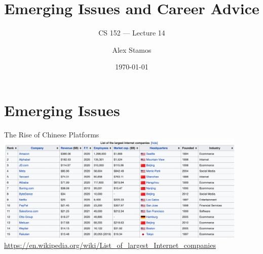 \documentclass[nobackground,dvipsnames,table,aspectratio=169]{beamer}
\title{Emerging Issues and Career Advice}
\subtitle{CS 152 --- Lecture 14}
\author[A. Stamos]{Alex Stamos}
\institute[Stanford University]{Stanford Cyber Policy Center}
\date[2022]{\today}
\begin{document}
\begin{frame}
    \titlepage
\end{frame}

\section{Emerging Issues}

\begin{frame}{The Rise of Chinese Platforms}
    \centering
    \includegraphics[width=0.9\textwidth]{rise-of-chinese-platforms}
    \underline{\url{https://en.wikipedia.org/wiki/List_of_largest_Internet_companies}}
\end{frame}
\end{document}
